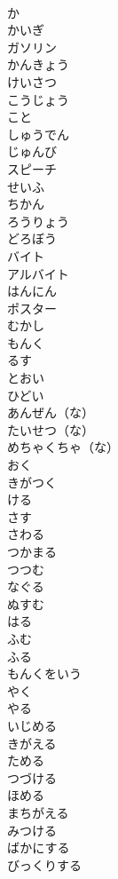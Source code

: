 \documentclass[8pt]{extreport}
\begin{document}
\begin{CJK}{UTF8}{min}
\\	か	
\\	かいぎ	
\\	ガソリン	
\\	かんきょう	
\\	けいさつ	
\\	こうじょう	
\\	こと	
\\	しゅうでん	
\\	じゅんび	
\\	スピーチ	
\\	せいふ	
\\	ちかん	
\\	ろうりょう	
\\	どろぼう	
\\	バイト	
\\	アルバイト
\\	はんにん	
\\	ポスター	
\\	むかし	
\\	もんく	
\\	るす	
\\	とおい	
\\	ひどい	
\\	あんぜん（な）	
\\	たいせつ（な）	
\\	めちゃくちゃ（な）	
\\	おく	
\\	きがつく	
\\	ける	
\\	さす	
\\	さわる	
\\	つかまる	
\\	つつむ	
\\	なぐる	
\\	ぬすむ	
\\	はる	
\\	ふむ	
\\	ふる	
\\	もんくをいう	
\\	やく	
\\	やる	
\\	いじめる	
\\	きがえる	
\\	ためる	
\\	つづける	
\\	ほめる	
\\	まちがえる	
\\	みつける	
\\	ばかにする	
\\	びっくりする	

\end{CJK}
\end{document}
